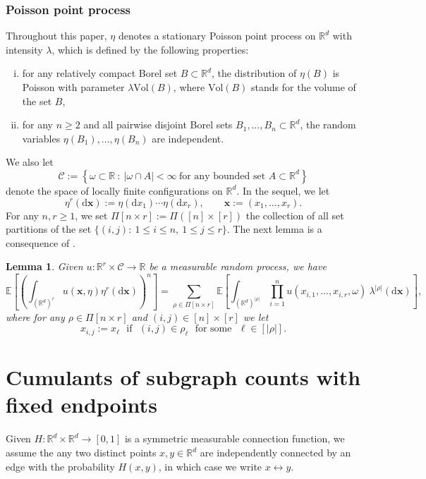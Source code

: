 \documentclass[12pt]{article}
\newcommand{\R}{\mathbb{R}}
\newcommand{\E}{\mathbb{E}}
\newtheorem{lemma}[prop]{Lemma}
\def\real{{\mathord{\mathbb R}}}
\numberwithin{equation}{section}
\begin{document}
\subsubsection*{Poisson point process} 
\noindent 
Throughout this paper, $\eta$ denotes a stationary Poisson point process on $\R^d$ with intensity $\lambda$, which is defined by the following properties: \begin{enumerate}[i)]
\item for any relatively compact Borel set $B\subset \R^d$, the distribution of $\eta(B)$ is Poisson with parameter $\lambda \mathrm{Vol}(B)$, where $ \mathrm{Vol}(B)$ stands for the volume of the set $B$, 
\item for any $n\geq 2$ and all pairwise disjoint Borel sets $B_1, \ldots ,B_n\subset\R^d$, the random variables $\eta(B_1), \ldots ,\eta(B_n)$ are independent.
\end{enumerate}
 We also let 
 $$\mathcal{C}:=\left\{\omega\subset\R \ : \ |\omega\cap A|<\infty ~\text{for any bounded set $A\subset\R^d$}\right\}
 $$
 denote the space of locally finite configurations on $\R^d$. 
In the sequel, we let 
$$
\eta^r (\mathrm{d}\mathbf{x}):=\eta(\mathrm{d}x_1)\cdots\eta(\mathrm{d}x_r),
 \qquad \mathbf{x}:=(x_1, \ldots ,x_r). 
$$
 For any $n,r\geq 1$, we set $\Pi [n\times r]:=\Pi ([n]\times[r])$ the collection of all set partitions of the set $\{(i,j):~1\leq i\leq n,~1\leq j\leq r\}$. 
 The next lemma is a consequence of \cite[Proposition~2]{prkhp}.
 \begin{lemma}
  \label{fjl}
   Given $u:\R^r\times \mathcal{C}\to\R$ be a measurable random process,
 we have 
\begin{equation} 
\label{fjkld2}
  \E\left[\left(\int_{(\R^d)^r}u(\mathbf{x},\eta)\eta^r (\mathrm{d}\mathbf{x})\right)^n\right]=\sum_{\rho\in\Pi [n\times r]}\E\left[\int_{(\R^d)^{|\rho|}}
    \prod_{i=1}^nu(x_{i,1}, \ldots ,x_{i,r},\omega) \ \! 
    \lambda^{|\rho|} ( \mathrm{d}\mathbf{x} ) \right], 
\end{equation} 
 where for any $\rho \in\Pi[n\times r]$
 and
 $(i,j) \in [n] \times [r]$ 
 we let 
 $$
 x_{i,j}:=x_\ell \mbox{ ~if~ } (i,j)\in\rho_\ell
 \mbox{ ~for some~ } \ell\in [|\rho |].
 $$
\end{lemma}
\section{Cumulants of subgraph counts with fixed endpoints} %
\label{diagramrepresentation}
\noindent
Given $H:\R^d\times \R^d\to[0,1]$ is a symmetric measurable connection
function, we assume the any two distinct points $x,y\in\real^d$ are
independently connected by an edge with the probability $H(x,y)$,
in which case we write $x\leftrightarrow y$. 
\end{document}

